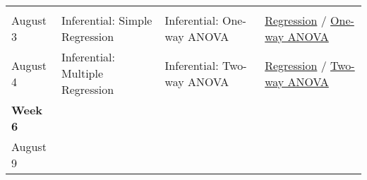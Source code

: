 \documentclass[
]{book}
\begin{document}
\begin{longtable}[]{@{}llll@{}}
\begin{minipage}[t]{0.18\columnwidth}
\end{minipage}\tabularnewline
\begin{minipage}[t]{0.09\columnwidth}\raggedright
August 3\strut
\end{minipage} & \begin{minipage}[t]{0.32\columnwidth}\raggedright
Inferential: Simple Regression\strut
\end{minipage} & \begin{minipage}[t]{0.29\columnwidth}\raggedright
Inferential: One-way ANOVA\strut
\end{minipage} & \begin{minipage}[t]{0.18\columnwidth}\raggedright
\href{https://learningstatisticswithr.com/book/regression.html}{Regression} / \href{https://learningstatisticswithr.com/book/anova.html}{One-way ANOVA}\strut
\end{minipage}\tabularnewline
\begin{minipage}[t]{0.09\columnwidth}\raggedright
August 4\strut
\end{minipage} & \begin{minipage}[t]{0.32\columnwidth}\raggedright
Inferential: Multiple Regression\strut
\end{minipage} & \begin{minipage}[t]{0.29\columnwidth}\raggedright
Inferential: Two-way ANOVA\strut
\end{minipage} & \begin{minipage}[t]{0.18\columnwidth}\raggedright
\href{https://learningstatisticswithr.com/book/regression.html}{Regression} / \href{https://learningstatisticswithr.com/book/anova2.html}{Two-way ANOVA}\strut
\end{minipage}\tabularnewline
\begin{minipage}[t]{0.09\columnwidth}\raggedright
\textbf{Week 6}\strut
\end{minipage} & \begin{minipage}[t]{0.32\columnwidth}\raggedright
\strut
\end{minipage} & \begin{minipage}[t]{0.29\columnwidth}\raggedright
\strut
\end{minipage} & \begin{minipage}[t]{0.18\columnwidth}\raggedright
\strut
\end{minipage}\tabularnewline
\begin{minipage}[t]{0.09\columnwidth}\raggedright
August 9\strut
\end{minipage} & \begin{minipage}[t]{0.32\columnwidth}\raggedright

\end{minipage}
\end{longtable}
\end{document}

